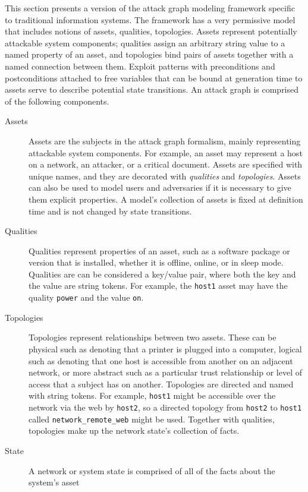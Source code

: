 This section presents a version of the attack graph modeling framework specific
to traditional information systems. The framework has a very permissive model that
includes notions of assets, qualities, topologies. Assets represent potentially
attackable system components; qualities assign an arbitrary string value to a named
property of an asset, and topologies bind pairs of assets together with a named
connection between them. Exploit patterns with preconditions and postconditions attached
to free variables that can be bound at generation time to assets serve to describe potential
state transitions.
An attack graph is comprised of the following components.
\begin{description}
	\item[Assets] Assets are the subjects in the attack graph formalism, mainly representing
		attackable system components. For example, an asset may represent a host
        on a network, an attacker, or a critical document. Assets are specified
		with unique names, and they are decorated with \emph{qualities} and \emph{topologies}.
		Assets can also be used to model users and adversaries if it is necessary to give them
		explicit properties. A model's collection of assets is fixed at definition time and
		is not changed by state transitions.
	\item[Qualities] Qualities represent properties of an asset, such as a software package or
		version that is installed, whether it is offline, online, or in sleep mode. Qualities are
		can be considered a key/value pair, where both the key and the value are string tokens. For
		example, the \texttt{host1} asset may have the quality \texttt{power} and the value \texttt{on}.
	\item[Topologies] Topologies represent relationships between two assets. These can be physical such
		as denoting that a printer is plugged into a computer, logical such as denoting that one
		host is accessible from another on an adjacent network, or more abstract such as a particular
		trust relationship or level of access that a subject has on another. Topologies are directed and
		named with string tokens. For example, \texttt{host1} might be accessible over the network via the
		web by \texttt{host2}, so a directed topology from \texttt{host2} to \texttt{host1} called
		\texttt{network\_remote\_web} might be used. Together with qualities, topologies make up the
		network state's collection of facts.
	\item[State] A network or system state is comprised of all of the facts about the system's asset

\end{description}
